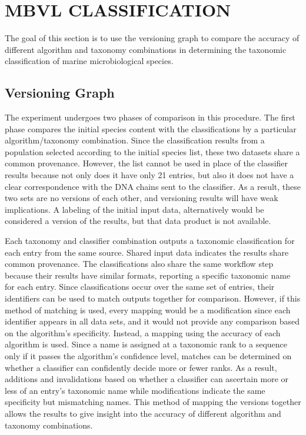 
\chapter{MBVL CLASSIFICATION}

The goal of this section is to use the versioning graph to compare the accuracy of different algorithm and taxonomy combinations in determining the taxonomic classification of marine microbiological species.

\section{Versioning Graph}

The experiment undergoes two phases of comparison in this procedure.
The first phase compares the initial species content with the classifications by a particular algorithm/taxonomy combination.
Since the classification results from a population selected according to the initial species list, these two datasets share a common provenance.
However, the list cannot be used in place of the classifier results because not only does it have only 21 entries, but also it does not have a clear correspondence with the DNA chains sent to the classifier.
As a result, these two sets are no versions of each other, and versioning results will have weak implications.
A labeling of the initial input data, alternatively would be considered a version of the results, but that data product is not available.

Each taxonomy and classifier combination outputs a taxonomic classification for each entry from the same source.
Shared input data indicates the results share common provenance.
The classifications also share the same workflow step because their results have similar formats, reporting a specific taxonomic name for each entry.
Since classifications occur over the same set of entries, their identifiers can be used to match outputs together for comparison.
However, if this method of matching is used, every mapping would be a modification since each identifier appears in all data sets, and it would not provide any comparison based on the algorithm's specificity.
Instead, a mapping using the accuracy of each algorithm is used.
Since a name is assigned at a taxonomic rank to a sequence only if it passes the algorithm's confidence level, matches can be determined on whether a classifier can confidently decide more or fewer ranks.
As a result, additions and invalidations based on whether a classifier can ascertain more or less of an entry's taxonomic name while modifications indicate the same specificity but mismatching names.
This method of mapping the versions together allows the results to give insight into the accuracy of different algorithm and taxonomy combinations.

